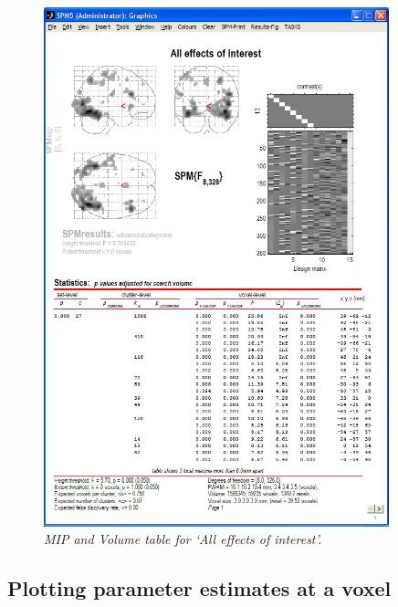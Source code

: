 \documentclass[a4paper,titlepage]{book}
\begin{document}
\begin{figure}
\begin{center}
\includegraphics[width=100mm]{cat_all_volume}
\caption{\em MIP and Volume table for `All effects of interest'. \label{cat_all_volume} }
\end{center}
\end{figure}


 

\subsection{Plotting parameter estimates at a voxel}
\end{document}
